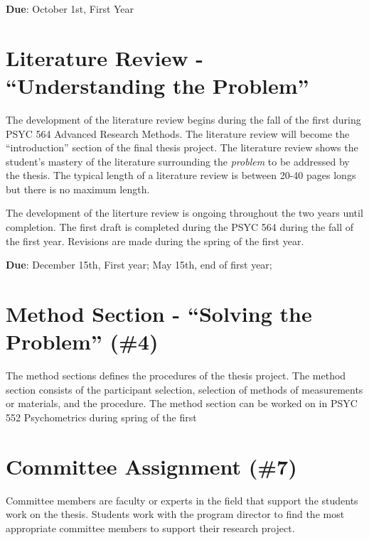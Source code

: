 \documentclass[]{book}
\begin{document}
\textbf{Due}: October 1st, First Year

\hypertarget{literature-review---understanding-the-problem}{%
\section{Literature Review - ``Understanding the Problem''}\label{literature-review---understanding-the-problem}}

The development of the literature review begins during the fall of the first during PSYC 564 Advanced Research Methods. The literature review will become the ``introduction'' section of the final thesis project. The literature review shows the student's mastery of the literature surrounding the \emph{problem} to be addressed by the thesis. The typical length of a literature review is between 20-40 pages longs but there is no maximum length.

The development of the literture review is ongoing throughout the two years until completion. The first draft is completed during the PSYC 564 during the fall of the first year. Revisions are made during the spring of the first year.

\textbf{Due}: December 15th, First year; May 15th, end of first year;

\hypertarget{method-section---solving-the-problem-4}{%
\section{Method Section - ``Solving the Problem'' (\#4)}\label{method-section---solving-the-problem-4}}

The method sections defines the procedures of the thesis project. The method section consists of the participant selection, selection of methods of measurements or materials, and the procedure. The method section can be worked on in PSYC 552 Psychometrics during spring of the first

\hypertarget{committee-assignment-7}{%
\section{Committee Assignment (\#7)}\label{committee-assignment-7}}

Committee members are faculty or experts in the field that support the students work on the thesis. Students work with the program director to find the most appropriate committee members to support their research project.
\end{document}

